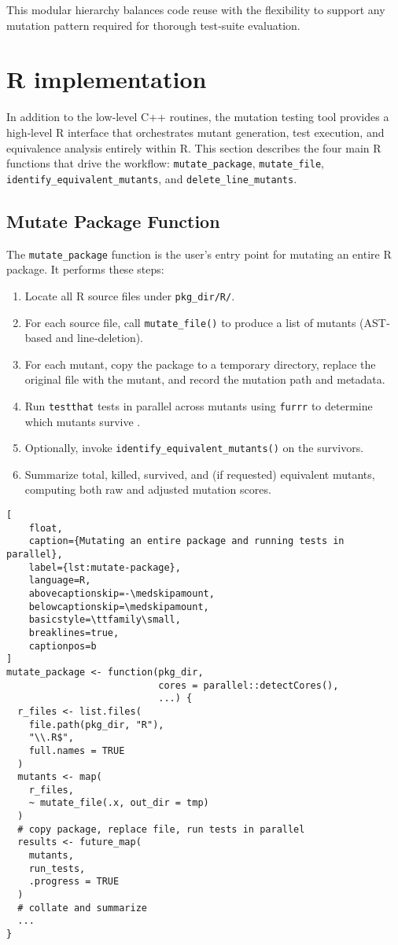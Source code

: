 This modular hierarchy balances code reuse with the flexibility to support any mutation pattern required for thorough test‐suite evaluation.

\section{R implementation}

In addition to the low‐level C++ routines, the mutation testing tool provides a high‐level R interface that orchestrates mutant generation, test execution, and equivalence analysis entirely within R.  This section describes the four main R functions that drive the workflow: \texttt{mutate\_package}, \texttt{mutate\_file}, \texttt{identify\_equivalent\_mutants}, and \texttt{delete\_line\_mutants}.

\subsection{Mutate Package Function}

The \texttt{mutate\_package} function is the user’s entry point for mutating an entire R package.  It performs these steps:

\begin{enumerate}
  \item Locate all R source files under \texttt{pkg\_dir/R/}.  
  \item For each source file, call \texttt{mutate\_file()} to produce a list of mutants (AST‐based and line‐deletion).  
  \item For each mutant, copy the package to a temporary directory, replace the original file with the mutant, and record the mutation path and metadata.  
  \item Run \texttt{testthat} tests in parallel across mutants using \texttt{furrr} to determine which mutants survive \cite{wickham2011testthat,Vaughan2020furrr}.  
  \item Optionally, invoke \texttt{identify\_equivalent\_mutants()} on the survivors.  
  \item Summarize total, killed, survived, and (if requested) equivalent mutants, computing both raw and adjusted mutation scores.
\end{enumerate}

\medskip
\begin{lstlisting}[
    float,
    caption={Mutating an entire package and running tests in parallel},
    label={lst:mutate-package},
    language=R,
    abovecaptionskip=-\medskipamount,
    belowcaptionskip=\medskipamount,
    basicstyle=\ttfamily\small,
    breaklines=true,
    captionpos=b
]
mutate_package <- function(pkg_dir,
                           cores = parallel::detectCores(),
                           ...) {
  r_files <- list.files(
    file.path(pkg_dir, "R"),
    "\\.R$",
    full.names = TRUE
  )
  mutants <- map(
    r_files,
    ~ mutate_file(.x, out_dir = tmp)
  )
  # copy package, replace file, run tests in parallel
  results <- future_map(
    mutants,
    run_tests,
    .progress = TRUE
  )
  # collate and summarize
  ...
}
\end{lstlisting}


